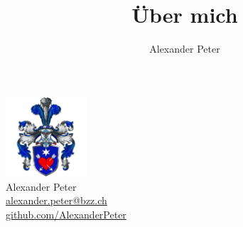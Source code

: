 \documentclass[aspectratio=169]{beamer}
\title{Über mich}
\author{Alexander Peter}
\date{}
\begin{document}
\begin{frame}
    \centering
    \includegraphics[width=3cm]{images/profile-picture.png}\\[0.5cm]
    {\Huge Alexander Peter}\\[0.3cm]
    \href{mailto:alexander.peter@bzz.ch}{alexander.peter@bzz.ch} \\
    \href{https://github.com/AlexanderPeter}{github.com/AlexanderPeter}
\end{frame}
\end{document}
